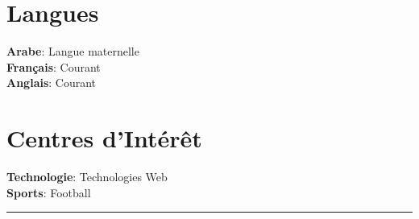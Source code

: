 \documentclass[A4,11pt]{article}
\begin{document}
\begin{minipage}[t]{0.48\textwidth}
\section{\faLanguage \hspace{0.2cm} Langues}
\begin{itemize}[leftmargin=0.4cm, label={}]
    \small{\item{
        \textbf{\color{primarycolor}Arabe}{: \color{darkgray}Langue maternelle} \\[1pt]
        \textbf{\color{primarycolor}Français}{: \color{darkgray}Courant} \\[1pt]
        \textbf{\color{primarycolor}Anglais}{: \color{darkgray}Courant}
    }}
\end{itemize}
\end{minipage}
\hfill
\begin{minipage}[t]{0.48\textwidth}
\section{\faHeart \hspace{0.2cm} Centres d'Intérêt}
\begin{itemize}[leftmargin=0.4cm, label={}]
    \small{\item{
        \textbf{\color{primarycolor}Technologie}{: \color{darkgray} Technologies Web} \\[1pt]
        \textbf{\color{primarycolor}Sports}{: \color{darkgray}Football}
    }}
\end{itemize}
\end{minipage}

\vspace{5pt}
\begin{center}
    {\color{primarycolor}\rule{0.5\textwidth}{1pt}}
\end{center}
\end{document}
